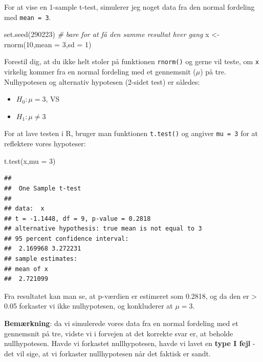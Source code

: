 \documentclass[
]{book}
\newenvironment{Shaded}{\begin{snugshade}}{\end{snugshade}}
\newcommand{\AttributeTok}[1]{\textcolor[rgb]{0.77,0.63,0.00}{#1}}
\newcommand{\CommentTok}[1]{\textcolor[rgb]{0.56,0.35,0.01}{\textit{#1}}}
\newcommand{\DecValTok}[1]{\textcolor[rgb]{0.00,0.00,0.81}{#1}}
\newcommand{\FunctionTok}[1]{\textcolor[rgb]{0.00,0.00,0.00}{#1}}
\newcommand{\NormalTok}[1]{#1}
\newcommand{\OtherTok}[1]{\textcolor[rgb]{0.56,0.35,0.01}{#1}}
\providecommand{\tightlist}{%
  \setlength{\itemsep}{0pt}\setlength{\parskip}{0pt}}
\begin{document}
For at vise en 1-sample t-test, simulerer jeg noget data fra den normal fordeling med \texttt{mean\ =\ 3}.

\begin{Shaded}
\begin{Highlighting}[]
\FunctionTok{set.seed}\NormalTok{(}\DecValTok{290223}\NormalTok{) }\CommentTok{\# bare for at få den samme resultat hver gang}
\NormalTok{x }\OtherTok{\textless{}{-}} \FunctionTok{rnorm}\NormalTok{(}\DecValTok{10}\NormalTok{,}\AttributeTok{mean =} \DecValTok{3}\NormalTok{,}\AttributeTok{sd =} \DecValTok{1}\NormalTok{)}
\end{Highlighting}
\end{Shaded}

Forestil dig, at du ikke helt stoler på funktionen \texttt{rnorm()} og gerne vil teste, om \texttt{x} virkelig kommer fra en normal fordeling med et gennemsnit (\(\mu\)) på tre. Nulhypotesen og alternativ hypotesen (2-sidet test) er således:

\begin{itemize}
\tightlist
\item
  \(H_{0}: \mu = 3\), VS
\item
  \(H_{1}: \mu \neq 3\)
\end{itemize}

For at lave testen i R, bruger man funktionen \texttt{t.test()} og angiver \texttt{mu\ =\ 3} for at reflektere vores hypoteser:

\begin{Shaded}
\begin{Highlighting}[]
\FunctionTok{t.test}\NormalTok{(x,}\AttributeTok{mu =} \DecValTok{3}\NormalTok{)}
\end{Highlighting}
\end{Shaded}

\begin{verbatim}
## 
##  One Sample t-test
## 
## data:  x
## t = -1.1448, df = 9, p-value = 0.2818
## alternative hypothesis: true mean is not equal to 3
## 95 percent confidence interval:
##  2.169968 3.272231
## sample estimates:
## mean of x 
##  2.721099
\end{verbatim}

Fra resultatet kan man se, at p-værdien er estimeret som 0.2818, og da den er \textgreater{} 0.05 forkaster vi ikke nulhypotesen, og konkluderer at \(\mu = 3\).

\textbf{Bemærkning}: da vi simulerede vores data fra en normal fordeling med et gennemsnit på tre, vidste vi i forvejen at det korrekte svar er, at beholde nullhypotesen. Havde vi forkastet nullhypotesen, havde vi lavet en \textbf{type I fejl} - det vil sige, at vi forkaster nullhypotesen når det faktisk er sandt.
\end{document}
